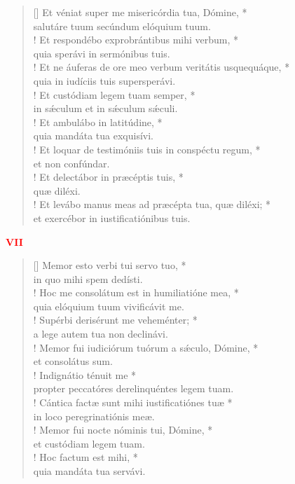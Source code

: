 \begin{verse}[\versewidth]
Et véniat super me misericórdia tua, Dómine, *\\
salutáre tuum secúndum elóquium tuum.\\!
\vin Et respondébo exprobrántibus mihi verbum, *\\
\vin quia sperávi in sermónibus tuis.\\!
Et ne áuferas de ore meo verbum veritátis usquequáque, *\\
quia in iudíciis tuis supersperávi.\\!
\vin Et custódiam legem tuam semper, *\\
\vin in s\'{æ}culum et in s\'{æ}culum s\'{æ}culi.\\!
Et ambulábo in latitúdine, *\\
quia mandáta tua exquisívi.\\!
\vin Et loquar de testimóniis tuis in conspéctu regum, *\\
\vin et non confúndar.\\!
Et delectábor in præcéptis tuis, *\\
quæ diléxi.\\!
\vin Et levábo manus meas ad præcépta tua, quæ diléxi; *\\
\vin et exercébor in iustificatiónibus tuis.\\
\end{verse}
\begin{center}
\textcolor{red}{\bf VII}\\
\end{center}
\begin{verse}[\versewidth]
Memor esto verbi tui servo tuo, *\\
in quo mihi spem dedísti.\\!
\vin Hoc me consolátum est in humiliatióne mea, *\\
\vin quia elóquium tuum vivificávit me.\\!
Supérbi derisérunt me veheménter; *\\
a lege autem tua non declinávi.\\!
\vin Memor fui iudiciórum tuórum a s\'{æ}culo, Dómine, *\\
\vin et consolátus sum.\\!
Indignátio ténuit me *\\
propter peccatóres derelinquéntes legem tuam.\\!
\vin Cántica factæ sunt mihi iustificatiónes tuæ *\\
\vin in loco peregrinatiónis meæ.\\!
Memor fui nocte nóminis tui, Dómine, *\\
et custódiam legem tuam.\\!
\vin Hoc factum est mihi, *\\
\vin quia mandáta tua servávi.\\
\end{verse}
\vspace{1cm}


